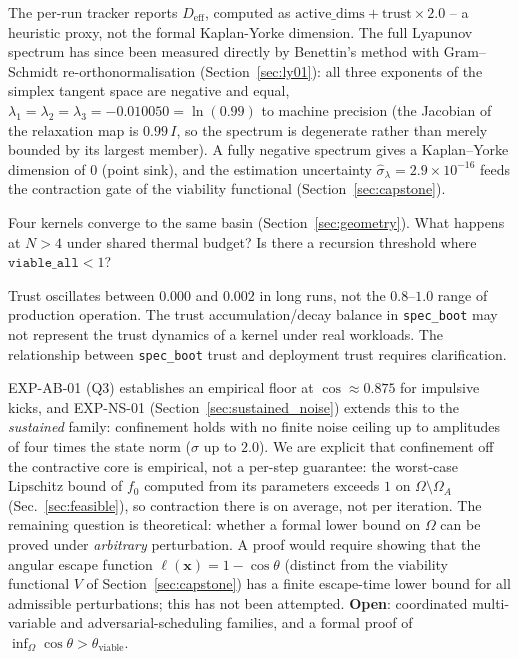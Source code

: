 \documentclass[11pt, a4paper]{article}
\begin{document}
\begin{description}[itemsep=0.55em]
  \item[Q4 -- Lyapunov spectrum \textnormal{(resolved, EXP-LY-01)}]
    The per-run tracker reports $D_\text{eff}$, computed as
    $\text{active\_dims} + \text{trust} \times 2.0$ -- a heuristic proxy,
    not the formal Kaplan-Yorke dimension.
    The full Lyapunov spectrum has since been measured directly by Benettin's
    method with Gram--Schmidt re-orthonormalisation (Section~\ref{sec:ly01}):
    all three exponents of the simplex tangent space are negative and equal,
    $\lambda_1 = \lambda_2 = \lambda_3 = -0.010050 = \ln(0.99)$ to machine
    precision (the Jacobian of the relaxation map is $0.99\,I$, so the spectrum
    is degenerate rather than merely bounded by its largest member).
    A fully negative spectrum gives a Kaplan--Yorke dimension of $0$ (point sink),
    and the estimation uncertainty $\hat\sigma_\lambda = 2.9\times 10^{-16}$ feeds
    the contraction gate of the viability functional
    (Section~\ref{sec:capstone}).

  \item[Q5 -- Multi-kernel attractor interaction]
    Four kernels converge to the same basin (Section~\ref{sec:geometry}).
    What happens at $N > 4$ under shared thermal budget?
    Is there a recursion threshold where $\texttt{viable\_all} < 1$?

  \item[Q6 -- Trust dynamics]
    Trust oscillates between $0.000$ and $0.002$ in long runs,
    not the $0.8$--$1.0$ range of production operation.
    The trust accumulation/decay balance in \texttt{spec\_boot} may not
    represent the trust dynamics of a kernel under real workloads.
    The relationship between \texttt{spec\_boot} trust and deployment
    trust requires clarification.

  \item[Q7 -- formal lower limit on $\Omega$ \textnormal{(sustained case now measured)}]
    EXP-AB-01 (Q3) establishes an empirical floor at $\cos \approx 0.875$ for
    impulsive kicks, and EXP-NS-01 (Section~\ref{sec:sustained_noise}) extends
    this to the \emph{sustained} family: confinement holds with no finite noise
    ceiling up to amplitudes of four times the state norm ($\sigma$ up to $2.0$).
    We are explicit that confinement off the contractive core is empirical, not a
    per-step guarantee: the worst-case Lipschitz bound of $f_0$ computed from its
    parameters exceeds $1$ on $\Omega \setminus \Omega_A$ (Sec.~\ref{sec:feasible}),
    so contraction there is on average, not per iteration.
    The remaining question is theoretical: whether a formal lower bound on
    $\Omega$ can be proved under \emph{arbitrary} perturbation.
    A proof would require showing that the angular escape function
    $\ell(\mathbf{x}) = 1 - \cos\theta$ (distinct from the viability functional
    $V$ of Section~\ref{sec:capstone}) has a finite escape-time lower bound for
    all admissible perturbations; this has not been attempted.
    \textbf{Open}: coordinated multi-variable and adversarial-scheduling families,
    and a formal proof of $\inf_\Omega \cos\theta > \theta_\text{viable}$.


\end{description}
\end{document}
